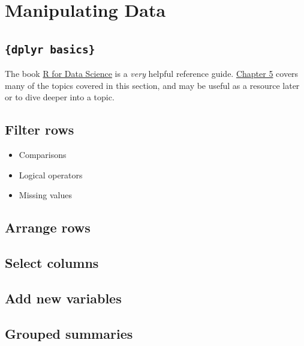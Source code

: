 \documentclass[
]{book}
\providecommand{\tightlist}{%
  \setlength{\itemsep}{0pt}\setlength{\parskip}{0pt}}
\begin{document}
\hypertarget{manipulation-data}{%
\chapter{Manipulating Data}\label{manipulation-data}}

\hypertarget{dplyr-basics}{%
\section*{\texorpdfstring{\texttt{\{dplyr\ basics\}}}{\{dplyr basics\}}}\label{dplyr-basics}}

The book \href{https://r4ds.had.co.nz/}{R for Data Science} is a \emph{very} helpful reference guide. \href{https://r4ds.had.co.nz/transform.html}{Chapter 5} covers many of the topics covered in this section, and may be useful as a resource later or to dive deeper into a topic.

\hypertarget{filter-rows}{%
\section{Filter rows}\label{filter-rows}}

\begin{itemize}
\tightlist
\item
  Comparisons
\item
  Logical operators
\item
  Missing values
\end{itemize}

\hypertarget{arrange-rows}{%
\section{Arrange rows}\label{arrange-rows}}

\hypertarget{select-columns}{%
\section{Select columns}\label{select-columns}}

\hypertarget{add-new-variables}{%
\section{Add new variables}\label{add-new-variables}}

\hypertarget{grouped-summaries}{%
\section{Grouped summaries}\label{grouped-summaries}}
\end{document}
